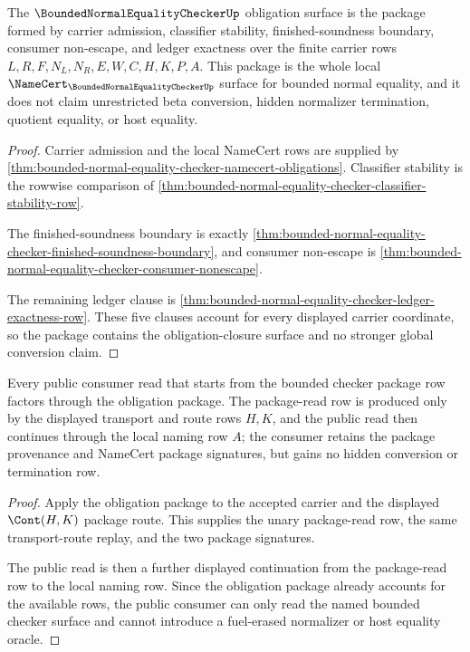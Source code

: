 \begin{theorem}
\label{thm:bounded-normal-equality-checker-obligation-package}
The $\BoundedNormalEqualityCheckerUp$ obligation surface is the package
formed by carrier admission, classifier stability, finished-soundness
boundary, consumer non-escape, and ledger exactness over the finite carrier
rows $L,R,F,N_L,N_R,E,W,C,H,K,P,A$. This package is the whole local
$\NameCert_{\BoundedNormalEqualityCheckerUp}$ surface for bounded normal
equality, and it does not claim unrestricted beta conversion, hidden
normalizer termination, quotient equality, or host equality.
\end{theorem}
\begin{proof}
Carrier admission and the local NameCert rows are supplied by
\autoref{thm:bounded-normal-equality-checker-namecert-obligations}. Classifier
stability is the rowwise comparison of
\autoref{thm:bounded-normal-equality-checker-classifier-stability-row}.

The finished-soundness boundary is exactly
\autoref{thm:bounded-normal-equality-checker-finished-soundness-boundary}, and
consumer non-escape is
\autoref{thm:bounded-normal-equality-checker-consumer-nonescape}.

The remaining ledger clause is
\autoref{thm:bounded-normal-equality-checker-ledger-exactness-row}. These
five clauses account for every displayed carrier coordinate, so the package
contains the obligation-closure surface and no stronger global conversion
claim.
\end{proof}

\begin{theorem}
\label{thm:bounded-normal-equality-checker-package-read-public-consumer}
Every public consumer read that starts from the bounded checker package row
factors through the obligation package. The package-read row is produced only by
the displayed transport and route rows $H,K$, and the public read then continues
through the local naming row $A$; the consumer retains the package provenance and
NameCert package signatures, but gains no hidden conversion or termination row.
\end{theorem}
\begin{proof}
Apply the obligation package to the accepted carrier and the displayed
$\Cont(H,K)$ package route. This supplies the unary package-read row, the same
transport-route replay, and the two package signatures.

The public read is then a further displayed continuation from the package-read
row to the local naming row. Since the obligation package already accounts for
the available rows, the public consumer can only read the named bounded checker
surface and cannot introduce a fuel-erased normalizer or host equality oracle.
\end{proof}

